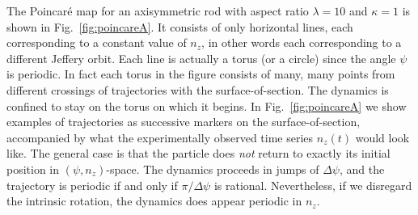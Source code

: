 \documentclass[thesis.tex]{subfiles}
\begin{document}
The Poincar\'e map for an axisymmetric rod with aspect ratio $\lambda=10$ and $\kappa=1$ is shown in Fig.~\ref{fig:poincareA}. It consists of only horizontal lines, each corresponding to a constant value of $n_z$, in other words each corresponding to a different Jeffery orbit. Each line is actually a torus (or a circle) since the angle $\psi$ is periodic. In fact each torus in the figure consists of many, many points from different crossings of trajectories with the surface-of-section. The dynamics is confined to stay on the torus on which it begins. In Fig.~\ref{fig:poincareA} we show examples of trajectories as successive markers on the surface-of-section, accompanied by what the experimentally observed time series $n_z(t)$ would look like. The general case is that the particle does \emph{not} return to exactly its initial position in $(\psi, n_z)$-space. The dynamics proceeds in jumps of $\Delta \psi$, and the trajectory is periodic if and only if $\pi/\Delta \psi$ is rational. Nevertheless, if we disregard the intrinsic rotation, the dynamics does appear periodic in $n_z$.
\end{document}
